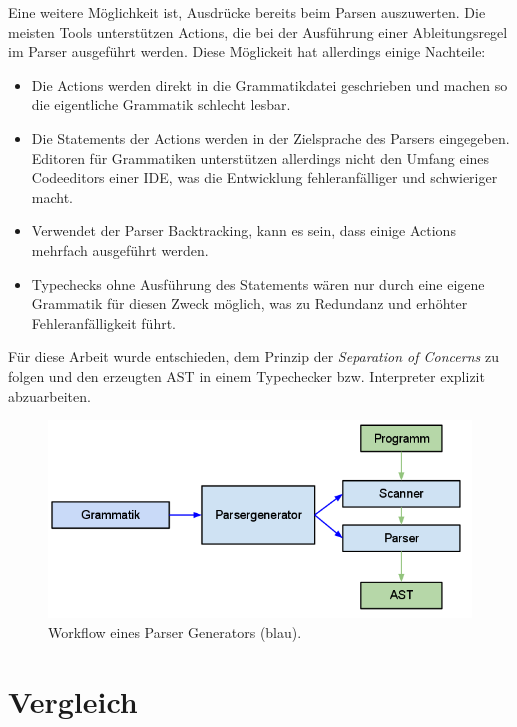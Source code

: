 Eine weitere Möglichkeit ist, Ausdrücke bereits beim Parsen auszuwerten. Die meisten Tools unterstützen Actions, die bei der Aus\-führ\-ung einer Ab\-lei\-tungs\-re\-gel im Parser ausgeführt werden. Diese Möglickeit hat allerdings einige Nachteile:

\begin{itemize}
  \item Die Actions werden direkt in die Grammatikdatei geschrieben und machen so die eigentliche Grammatik schlecht lesbar.
  \item Die Statements der Actions werden in der Zielsprache des Parsers eingegeben. Editoren für Grammatiken unterstützen allerdings nicht den Umfang eines Codeeditors einer IDE, was die Entwicklung fehleranfälliger und schwieriger macht.
  \item Verwendet der Parser Backtracking, kann es sein, dass einige Actions mehrfach ausgeführt werden.
  \item Typechecks ohne Aus\-führ\-ung des Statements wären nur durch eine eigene Grammatik für diesen Zweck möglich, was zu Redundanz und erhöhter Fehleranfälligkeit führt.
\end{itemize}

Für diese Arbeit wurde entschieden, dem Prinzip der \emph{Separation of Concerns} zu folgen und den erzeugten AST in einem Typechecker bzw. Interpreter explizit abzuarbeiten.

 

\begin{figure}[h]
\includegraphics[scale=0.6]{figures/parser_generator_workflow}
\caption{Workflow eines Parser Generators (blau).}
\label{abb_parser_generator_workflow}
\end{figure}



\section{Vergleich}
\label{tools_vergleich}

